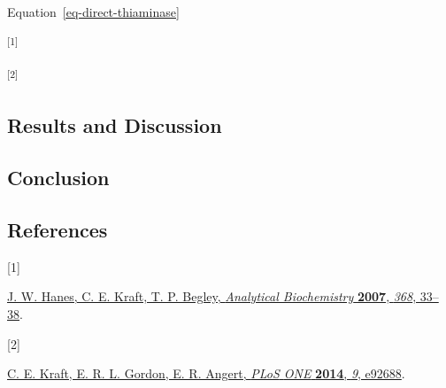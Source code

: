 \documentclass[
  letterpaper,
  DIV=11,
  numbers=noendperiod]{scrartcl}
\newlength{\cslhangindent}
\newlength{\csllabelwidth}
\newenvironment{CSLReferences}[2] %
 {\begin{list}{}{%
  \setlength{\itemindent}{0pt}
  \setlength{\leftmargin}{0pt}
  \setlength{\parsep}{0pt}
  \ifodd #1
   \setlength{\leftmargin}{\cslhangindent}
   \setlength{\itemindent}{-1\cslhangindent}
  \fi
  \setlength{\itemsep}{#2\baselineskip}}}
 {\end{list}}
\newcommand{\CSLLeftMargin}[1]{\parbox[t]{\csllabelwidth}{\strut#1\strut}}
\newcommand{\CSLRightInline}[1]{\parbox[t]{\linewidth - \csllabelwidth}{\strut#1\strut}}
\begin{document}
Equation~\ref{eq-direct-thiaminase}

\textsuperscript{{[}1{]}}

\textsuperscript{{[}2{]}}

\subsection{Results and Discussion}\label{results-and-discussion}

\subsection{Conclusion}\label{conclusion}

\subsection*{References}\label{references}

\label{refs}
\begin{CSLReferences}{0}{0}
\CSLLeftMargin{{[}1{]} }%
\CSLRightInline{\href{https://doi.org/10.1016/j.ab.2007.06.001}{J. W.
Hanes, C. E. Kraft, T. P. Begley, \emph{Analytical Biochemistry}
\textbf{2007}, \emph{368}, 33--38}.}

\CSLLeftMargin{{[}2{]} }%
\CSLRightInline{\href{https://doi.org/10.1371/journal.pone.0092688}{C.
E. Kraft, E. R. L. Gordon, E. R. Angert, \emph{{PLoS} {ONE}}
\textbf{2014}, \emph{9}, e92688}.}

\end{CSLReferences}
\end{document}
